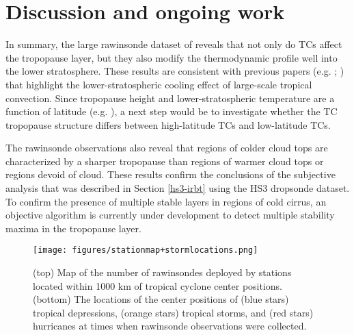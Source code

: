 \section{Discussion and ongoing work}
\label{sec:discussion}
In summary, the large rawinsonde dataset of \cite{DuranMolinari2016} reveals that not only do TCs affect the tropopause layer, but they also modify the thermodynamic profile well into the lower stratosphere.
These results are consistent with previous papers (e.g. \citeauthor{KuangBretherton2004} \citeyear{KuangBretherton2004}; \citeauthor{Salbyetal2003} \citeyear{Salbyetal2003}) that highlight the lower-stratospheric cooling effect of large-scale tropical convection.
Since tropopause height and lower-stratospheric temperature are a function of latitude (e.g. \citeauthor{HighwoodHoskins1998} \citeyear{HighwoodHoskins1998}), a next step would be to investigate whether the TC tropopause structure differs between high-latitude TCs and low-latitude TCs.

The rawinsonde observations also reveal that regions of colder cloud tops are characterized by a sharper tropopause than regions of warmer cloud tops or regions devoid of cloud.
These results confirm the conclusions of the subjective analysis that was described in Section \ref{hs3-irbt} using the HS3 dropsonde dataset.
To confirm the presence of multiple stable layers in regions of cold cirrus, an objective algorithm is currently under development to detect multiple stability maxima in the tropopause layer.


\begin{figure*}[ht]
\centerline{\texttt{[image: figures/stationmap+stormlocations.png]}}
\caption{(top) Map of the number of rawinsondes deployed by stations located within 1000 km of tropical cyclone center positions. (bottom) The locations of the center positions of (blue stars) tropical depressions, (orange stars) tropical storms, and (red stars) hurricanes at times when rawinsonde observations were collected.}
\label{fig:maps}
\end{figure*}

